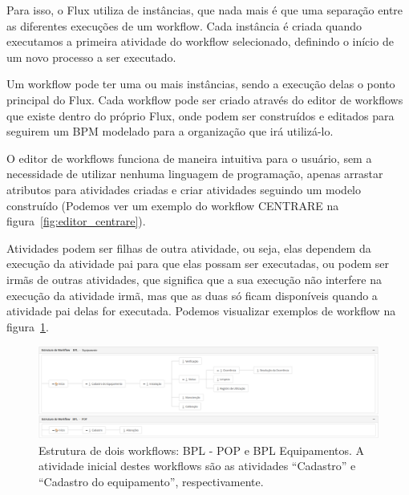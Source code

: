 Para isso, o Flux utiliza de instâncias, que nada mais é que uma separação entre as diferentes execuções de um workflow. Cada instância é criada quando executamos a primeira atividade do workflow selecionado, definindo o início de um novo processo a ser executado.

Um workflow pode ter uma ou mais instâncias, sendo a execução delas o ponto principal do Flux.
Cada workflow pode ser criado através do editor de workflows que existe dentro do próprio Flux, onde podem ser construídos e editados para seguirem um BPM modelado para a organização que irá utilizá-lo.

O editor de workflows funciona de maneira intuitiva para o usuário, sem a necessidade de utilizar nenhuma linguagem de programação, apenas arrastar atributos para atividades criadas e criar atividades seguindo um modelo construído (Podemos ver um exemplo do workflow CENTRARE na figura~\ref{fig:editor_centrare}).

Atividades podem ser filhas de outra atividade, ou seja, elas dependem da execução da atividade pai para que elas possam ser executadas, ou podem ser irmãs de outras atividades, que significa que a sua execução não interfere na execução da atividade irmã, mas que as duas só ficam disponíveis quando a atividade pai delas for executada. Podemos visualizar exemplos de workflow na figura~\ref{fig:estrutura_workflow}.

\begin{figure}
    \centering
    \includegraphics[width=1\textwidth]{imgs/BPL/estrutura.png}
    \caption{Estrutura de dois workflows: BPL - POP e BPL Equipamentos. A atividade inicial destes workflows são as atividades ``Cadastro'' e ``Cadastro do equipamento'', respectivamente.}
    \label{fig:estrutura_workflow}
\end{figure}

